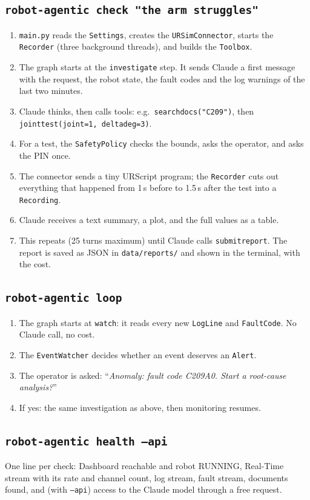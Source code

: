 \documentclass[10pt]{article}
\newcommand{\brkus}{\textunderscore\allowbreak}
\newcommand{\f}[1]{\texttt{\let\_\brkus #1}}
\begin{document}
\subsection{\f{robot-agentic check "the arm struggles"}}
\begin{enumerate}
\item \f{\_\_main\_\_.py} reads the \f{Settings}, creates the \f{URSimConnector}, starts the
\f{Recorder} (three background threads), and builds the \f{Toolbox}.
\item The graph starts at the \f{investigate} step. It sends Claude a first message with the
request, the robot state, the fault codes and the log warnings of the last two minutes.
\item Claude thinks, then calls tools: e.g.\ \f{search\_docs("C209")}, then
\f{joint\_test(joint=1, delta\_deg=3)}.
\item For a test, the \f{SafetyPolicy} checks the bounds, asks the operator, and asks the PIN once.
\item The connector sends a tiny URScript program; the \f{Recorder} cuts out everything that
happened from 1\,s before to 1.5\,s after the test into a \f{Recording}.
\item Claude receives a text summary, a plot, and the full values as a table.
\item This repeats (25 turns maximum) until Claude calls \f{submit\_report}. The report is saved
as JSON in \f{data/reports/} and shown in the terminal, with the cost.
\end{enumerate}

\subsection{\f{robot-agentic loop}}
\begin{enumerate}
\item The graph starts at \f{watch}: it reads every new \f{LogLine} and \f{FaultCode}. No Claude
call, no cost.
\item The \f{EventWatcher} decides whether an event deserves an \f{Alert}.
\item The operator is asked: ``\emph{Anomaly: fault code C209A0. Start a root-cause analysis?}''
\item If yes: the same investigation as above, then monitoring resumes.
\end{enumerate}

\subsection{\f{robot-agentic health --api}}
One line per check: Dashboard reachable and robot RUNNING, Real-Time stream with its rate and
channel count, log stream, fault stream, documents found, and (with \f{--api}) access to the
Claude model through a free request.
\end{document}

